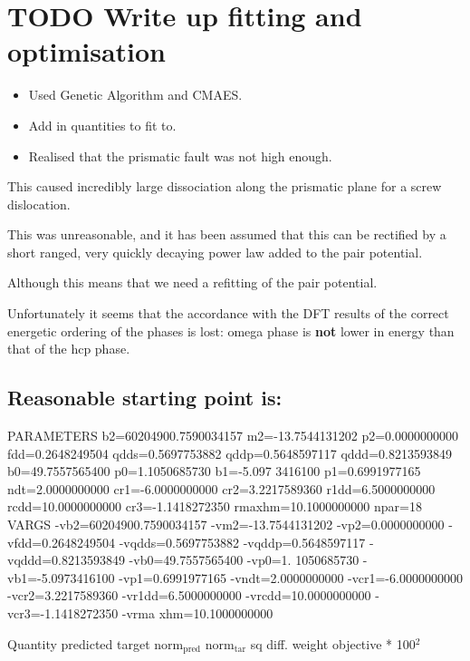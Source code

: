 \documentclass[11pt]{article}
\author{tigany}
\date{\today}
\title{}
\begin{document}
\tableofcontents

\section{{\bfseries\sffamily TODO} Write up fitting and optimisation}
\label{sec:org8208b33}
\begin{itemize}
\item Used Genetic Algorithm and CMAES.
\item Add in quantities to fit to.
\end{itemize}


\begin{itemize}
\item Realised that the prismatic fault was not high enough.
\end{itemize}

This caused incredibly large dissociation along the prismatic plane for a
screw dislocation. 

This was unreasonable, and it has been assumed that this can be rectified by a
short ranged, very quickly decaying power law added to the pair potential. 

Although this means that we need a refitting of the pair potential. 

Unfortunately it seems that the accordance with the DFT results of the
correct energetic ordering of the phases is lost: omega phase is \textbf{not}
lower in energy than that of the hcp phase.


\subsection{Reasonable starting point is:}
\label{sec:org9b1cf50}

PARAMETERS
  b2=60204900.7590034157 m2=-13.7544131202 p2=0.0000000000 fdd=0.2648249504 qdds=0.5697753882 qddp=0.5648597117 qddd=0.8213593849 b0=49.7557565400 p0=1.1050685730 b1=-5.097
3416100 p1=0.6991977165 ndt=2.0000000000 cr1=-6.0000000000 cr2=3.2217589360 r1dd=6.5000000000 rcdd=10.0000000000 cr3=-1.1418272350 rmaxhm=10.1000000000 npar=18 
VARGS
    -vb2=60204900.7590034157 -vm2=-13.7544131202 -vp2=0.0000000000 -vfdd=0.2648249504 -vqdds=0.5697753882 -vqddp=0.5648597117 -vqddd=0.8213593849 -vb0=49.7557565400 -vp0=1.
1050685730 -vb1=-5.0973416100 -vp1=0.6991977165 -vndt=2.0000000000 -vcr1=-6.0000000000 -vcr2=3.2217589360 -vr1dd=6.5000000000 -vrcdd=10.0000000000 -vcr3=-1.1418272350 -vrma
xhm=10.1000000000 

Quantity      predicted    target     norm\(_{\text{pred}}\)   norm\(_{\text{tar}}\)    sq diff.      weight    objective * 100\(^{\text{2}}\) 
\end{document}
